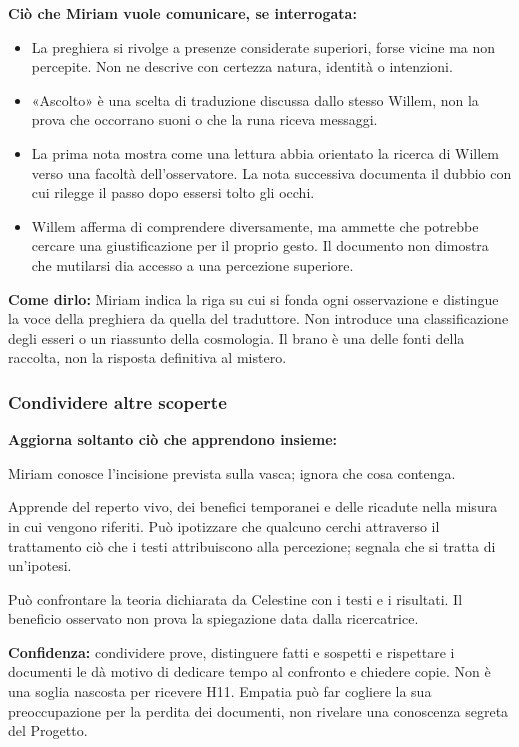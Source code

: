\documentclass[11pt,a4paper]{article}
\begin{document}
\textbf{Ciò che Miriam vuole comunicare, se interrogata:}
\begin{itemize}
\item La preghiera si rivolge a presenze considerate superiori, forse vicine ma non percepite. Non ne descrive con certezza natura, identità o intenzioni.
\item «Ascolto» è una scelta di traduzione discussa dallo stesso Willem, non la prova che occorrano suoni o che la runa riceva messaggi.
\item La prima nota mostra come una lettura abbia orientato la ricerca di Willem verso una facoltà dell'osservatore. La nota successiva documenta il dubbio con cui rilegge il passo dopo essersi tolto gli occhi.
\item Willem afferma di comprendere diversamente, ma ammette che potrebbe cercare una giustificazione per il proprio gesto. Il documento non dimostra che mutilarsi dia accesso a una percezione superiore.
\end{itemize}

\textbf{Come dirlo:} Miriam indica la riga su cui si fonda ogni osservazione e distingue la voce della preghiera da quella del traduttore. Non introduce una classificazione degli esseri o un riassunto della cosmologia. Il brano è una delle fonti della raccolta, non la risposta definitiva al mistero.

\subsubsection{Condividere altre scoperte}
\textbf{Aggiorna soltanto ciò che apprendono insieme:}
\begin{description}[leftmargin=5mm,style=nextline]
\item[H06b.] Miriam conosce l'incisione prevista sulla vasca; ignora che cosa contenga.
\item[H09 o testimonianze sul trattamento.] Apprende del reperto vivo, dei benefici temporanei e delle ricadute nella misura in cui vengono riferiti. Può ipotizzare che qualcuno cerchi attraverso il trattamento ciò che i testi attribuiscono alla percezione; segnala che si tratta di un'ipotesi.
\item[H16.] Può confrontare la teoria dichiarata da Celestine con i testi e i risultati. Il beneficio osservato non prova la spiegazione data dalla ricercatrice.
\end{description}

\textbf{Confidenza:} condividere prove, distinguere fatti e sospetti e rispettare i documenti le dà motivo di dedicare tempo al confronto e chiedere copie. Non è una soglia nascosta per ricevere H11. Empatia può far cogliere la sua preoccupazione per la perdita dei documenti, non rivelare una conoscenza segreta del Progetto.
\end{document}

